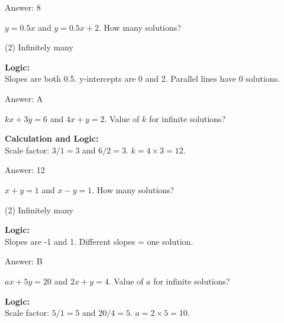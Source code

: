\documentclass[11pt,paper=a4,answers]{exam}
\begin{document}
\begin{questions}
\begin{solution}
\vspace{15pt}
Answer: \colorbox{yellow!100}{8}
\end{solution}

\question
$y = 0.5x$ and $y = 0.5x + 2$. How many solutions?
\begin{tasks}(2)
    \task Infinitely many
\end{tasks}

\begin{solution}
\textbf{Logic:} \\
Slopes are both 0.5. y-intercepts are 0 and 2. Parallel lines have 0 solutions.

\vspace{15pt}
Answer: \colorbox{yellow!100}{A}
\end{solution}

\question
$kx + 3y = 6$ and $4x + y = 2$. Value of $k$ for infinite solutions?

\begin{solution}
\textbf{Calculation and Logic:} \\
Scale factor: $3/1 = 3$ and $6/2 = 3$.
$k = 4 \times 3 = 12$.

\vspace{15pt}
Answer: \colorbox{yellow!100}{12}
\end{solution}

\question
$x + y = 1$ and $x - y = 1$. How many solutions?
\begin{tasks}(2)
    \task Infinitely many
\end{tasks}

\begin{solution}
\textbf{Logic:} \\
Slopes are -1 and 1. Different slopes = one solution.

\vspace{15pt}
Answer: \colorbox{yellow!100}{B}
\end{solution}

\question
$ax + 5y = 20$ and $2x + y = 4$. Value of $a$ for infinite solutions?

\begin{solution}
\textbf{Logic:} \\
Scale factor: $5/1 = 5$ and $20/4 = 5$.
$a = 2 \times 5 = 10$.


\end{solution}
\end{questions}
\end{document}
